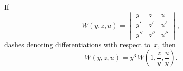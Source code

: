 If
\[
W(y, z, u) =
\begin{vmatrix}
y  & z  & u\\
y' & z' & u'\\
y''& z''& u''
\end{vmatrix},
\]
dashes denoting differentiations with
respect to~$x$, then
\[
W(y, z, u) = y^{3}\, W\left(1, \frac{z}{y}, \frac{u}{y}\right).
\]

